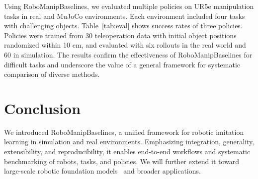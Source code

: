 \documentclass[letterpaper, 10 pt, conference]{ieeeconf}  %
\newcommand{\tabref}[1]{{Table~\ref{#1}}}
\begin{document}
Using RoboManipBaselines, we evaluated multiple policies on UR5e manipulation tasks in real and MuJoCo environments.
Each environment included four tasks with challenging objects.
\tabref{tab:eval} shows success rates of three policies.
Policies were trained from 30 teleoperation data with initial object positions randomized within 10 cm, and evaluated with six rollouts in the real world and 60 in simulation.
The results confirm the effectiveness of RoboManipBaselines for difficult tasks and underscore the value of a general framework for systematic comparison of diverse methods.


\section{Conclusion}

We introduced RoboManipBaselines, a unified framework for robotic imitation learning in simulation and real environments. Emphasizing integration, generality, extensibility, and reproducibility, it enables end-to-end workflows and systematic benchmarking of robots, tasks, and policies. We will further extend it toward large-scale robotic foundation models~\cite{pi0:Black:arXiv2024,GR00T:Bjorck:arXiv2025} and broader applications.


\clearpage
\onecolumn
\twocolumn
\balance


\end{document}
